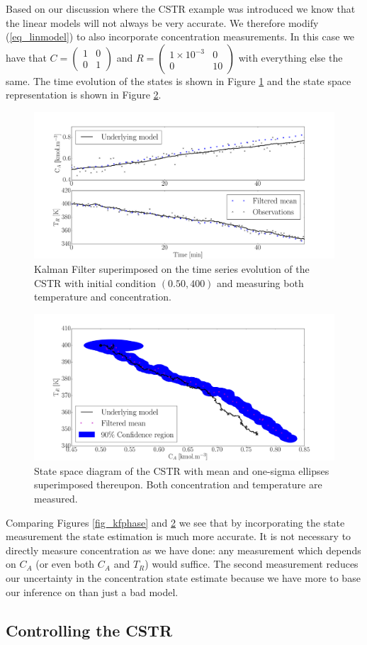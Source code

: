\documentclass[../masters.tex]{subfiles}
\begin{document}
Based on our discussion where the CSTR example was introduced we know that the linear models will not always be very accurate. We therefore modify (\ref{eq_linmodel}) to also incorporate concentration measurements. In this case we have that $C = \begin{pmatrix}
1 & 0\\0 &1
\end{pmatrix}$ and $R = \begin{pmatrix}
1\times 10^{-3} & 0\\0 & 10
\end{pmatrix}$ with everything else the same. The time evolution of the states is shown in Figure \ref{fig_kftime2} and the state space representation is shown in Figure \ref{fig_kfphase2}. 
\begin{figure}[H] 
\centering
\includegraphics[scale=0.30]{kalman_filter_timeseries_M2.pdf}
\caption{Kalman Filter superimposed on the time series evolution of the CSTR with initial condition $(0.50, 400)$ and measuring both temperature and concentration.}
\label{fig_kftime2}
\end{figure}
\begin{figure}[H] 
\centering
\includegraphics[scale=0.30]{kalman_filter_phase_M2.pdf}
\caption{State space diagram of the CSTR with mean and one-sigma ellipses superimposed thereupon. Both concentration and temperature are measured.}
\label{fig_kfphase2}
\end{figure}
Comparing Figures \ref{fig_kfphase} and \ref{fig_kfphase2} we see that by incorporating the state measurement the state estimation is much more accurate. It is not necessary to directly measure concentration as we have done: any measurement which depends on $C_A$ (or even both $C_A$ and $T_R$) would suffice. The second measurement reduces our uncertainty in the concentration state estimate because we have more to base our inference on than just a bad model.  

\subsection{Controlling the CSTR}



\end{document}
